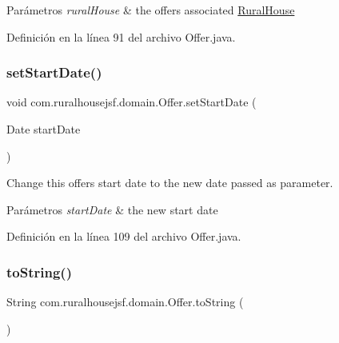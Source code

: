 \begin{DoxyParams}{Parámetros}
{\em rural\+House} & the offers associated \mbox{\hyperlink{classcom_1_1ruralhousejsf_1_1domain_1_1_rural_house}{Rural\+House}} \\
\hline
\end{DoxyParams}


Definición en la línea 91 del archivo Offer.\+java.

\mbox{\label{classcom_1_1ruralhousejsf_1_1domain_1_1_offer_ad829c57ed6d018c673d4fff942757ed4}} 
\subsubsection{\texorpdfstring{setStartDate()}{setStartDate()}}
{\footnotesize\ttfamily void com.\+ruralhousejsf.\+domain.\+Offer.\+set\+Start\+Date (\begin{DoxyParamCaption}\item[{Date}]{start\+Date }\end{DoxyParamCaption})}

Change this offers start date to the new date passed as parameter.


\begin{DoxyParams}{Parámetros}
{\em start\+Date} & the new start date \\
\hline
\end{DoxyParams}


Definición en la línea 109 del archivo Offer.\+java.

\mbox{\label{classcom_1_1ruralhousejsf_1_1domain_1_1_offer_a91920170708c786730b8707d51d5a810}} 
\subsubsection{\texorpdfstring{toString()}{toString()}}
{\footnotesize\ttfamily String com.\+ruralhousejsf.\+domain.\+Offer.\+to\+String (\begin{DoxyParamCaption}{ }\end{DoxyParamCaption})}



